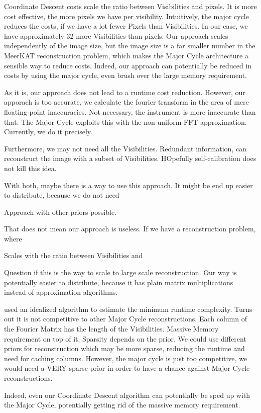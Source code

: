 Coordinate Descent costs scale the ratio between Visibilities and pixels. It is more cost effective, the more pixels we have per visibility.
Intuitively, the major cycle reduces the costs, if we have a lot fewer Pixels than Visibilities. In our case, we have approximately 32 more Visibilities than pixels. Our approach scales independently of the image size, but the image size is a far smaller number in the MeerKAT reconstruction problem, which makes the Major Cycle architecture a sensible way to reduce costs. Indeed, our approach can potentially be reduced in costs by using the major cycle, even brush over the large memory requirement.

As it is, our approach does not lead to a runtime cost reduction. However, our apporach is too accurate, we calculate the fourier transform in the area of mere floating-point inaccuracies. Not necessary, the instrument is more inaccurate than that. The Major Cycle exploits this with the non-uniform FFT approximation. Currently, we do it precisely.

Furthermore, we may not need all the Visibilities. Redundant information, can reconstruct the image with a subset of Visibilities. HOpefully self-calibration does not kill this idea.

With both, maybe there is a way to use this approach. It might be end up easier to distribute, because we do not need

Approach with other priors possible.










That does not mean our approach is useless. If we have a reconstruction problem, where 

Scales with the ratio between Visibilities and 

Question if this is the way to scale to large scale reconstruction. Our way is potentially easier to distribute, because it has plain matrix multiplications instead of approximation algorithms.

used an idealized algorithm to estimate the minimum runtime complexity. Turns out it is not competitive to other Major Cycle reconstructions. Each column of the Fourier Matrix has the length of the Visibilities. Massive Memory requirement on top of it.  Sparsity depends on the prior. We could use different priors for reconstruction which may be more sparse, reducing the runtime and need for caching columns. However, the major cycle is just too competitive, we would need a VERY sparse prior in order to have a chance against Major Cycle reconstructions.

Indeed, even our Coordinate Descent algorithm can potentially be sped up with the Major Cycle, potentially getting rid of the massive memory requirement.









 

